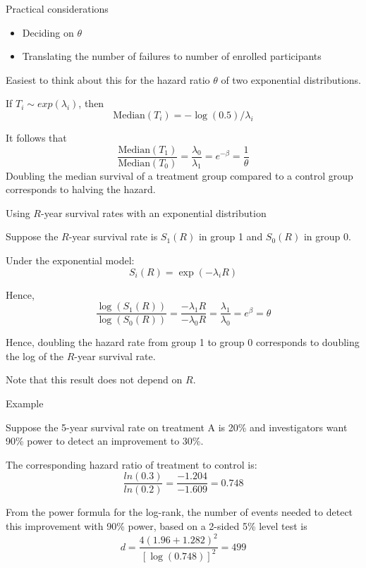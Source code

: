 \documentclass[ignorenonframetext,]{beamer}
\providecommand{\tightlist}{%
  \setlength{\itemsep}{0pt}\setlength{\parskip}{0pt}}
\begin{document}
\begin{frame}{%
\protect\hypertarget{practical-considerations}{%
Practical considerations}}

\begin{itemize}
\tightlist
\item
  Deciding on \(\theta\)
\item
  Translating the number of failures to number of enrolled participants
\end{itemize}

Easiest to think about this for the hazard ratio \(\theta\) of two
exponential distributions.

If \(T_i \sim exp(\lambda_i)\), then
\[   \text{Median}(T_i) = -\log(0.5)/\lambda_i \]

It follows that \[
\frac{\text{Median}(T_1)}{\text{Median}(T_0)} = \frac{\lambda_0}{\lambda_1} = e^{-\beta} = \frac{1}{\theta}
\] Doubling the median survival of a treatment group compared to a
control group corresponds to halving the hazard.

\end{frame}

\begin{frame}{%
\protect\hypertarget{using-r-year-survival-rates-with-an-exponential-distribution}{%
Using \(R\)-year survival rates with an exponential distribution}}

Suppose the \(R\)-year survival rate is \(S_1(R)\) in group 1 and
\(S_0(R)\) in group 0.

Under the exponential model: \[ S_i(R) = \exp(-\lambda_i R) \]

Hence, \[   \frac{\log(S_1(R))}{\log(S_0(R))} 
= \frac{-\lambda_1 R}{-\lambda_0 R} =\frac{\lambda_1}{\lambda_0} =
e^{\beta} = \theta\]

Hence, doubling the hazard rate from group 1 to group 0 corresponds to
doubling the log of the \(R\)-year survival rate.

Note that this result does not depend on \(R\).

\end{frame}

\begin{frame}{%
\protect\hypertarget{example-1}{%
Example}}

Suppose the 5-year survival rate on treatment A is 20\% and
investigators want 90\% power to detect an improvement to 30\%.

The corresponding hazard ratio of treatment to control is:
\[ \frac{ln(0.3)}{ln(0.2)} = \frac{-1.204}{-1.609} = 0.748 \]

From the power formula for the log-rank, the number of events needed to
detect this improvement with 90\% power, based on a 2-sided 5\% level
test is \[    d = \frac{4 (1.96 + 1.282)^2}{[\log(0.748)]^2}  =  499 \]

\end{frame}
\end{document}
